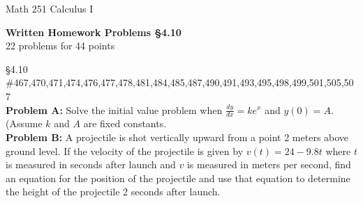 \documentclass[11pt]{report}
\theoremstyle{plain}
\begin{document}
\hfill Math 251 Calculus I
\begin{center}
\Large{\textbf{Written Homework Problems \S 4.10}} \\
22 problems for 44 points\\
\end{center}

\begin{description}
\item{\S 4.10} \#467,470,471,474,476,477,478,481,484,485,487,490,491,493,495,498,499,501,505,507\\

\textbf{Problem A:} Solve the initial value problem when $\frac{dy}{dx}=ke^x$ and $y(0)=A$. (Assume $k$ and $A$ are fixed constants.\\

\textbf{Problem B:} A projectile is shot vertically upward from a point 2 meters above ground level. If the velocity of the projectile is given by $v(t)=24 -9.8t$ where $t$ is measured in seconds after launch and $v$ is measured in meters per second, find an equation for the position of the projectile and use that equation to determine the height of the projectile 2 seconds after launch.

\end{description}
\end{document}
